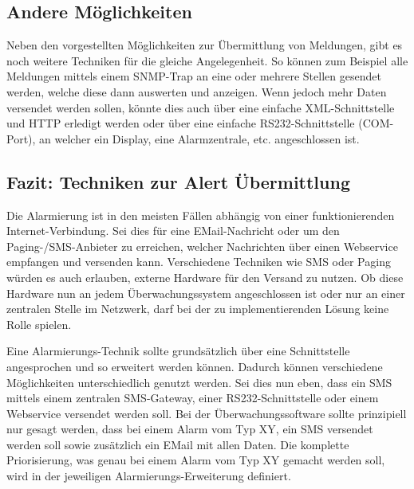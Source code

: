 \subsection{Andere M\"oglichkeiten} \label{sec:theorie-alert-other}
Neben den vorgestellten M\"oglichkeiten zur \"Ubermittlung von Meldungen, gibt es noch weitere Techniken f\"ur die gleiche Angelegenheit. So k\"onnen zum Beispiel alle Meldungen mittels einem SNMP-Trap an eine oder mehrere Stellen gesendet werden, welche diese dann auswerten und anzeigen. Wenn jedoch mehr Daten versendet werden sollen, k\"onnte dies auch \"uber eine einfache XML-Schnittstelle und HTTP erledigt werden oder \"uber eine einfache RS232-Schnittstelle (COM-Port), an welcher ein Display, eine Alarmzentrale, etc. angeschlossen ist.


\subsection{Fazit: Techniken zur Alert \"Ubermittlung} \label{sec:theorie-alert-fazit}
Die Alarmierung ist in den meisten F\"allen abh\"angig von einer funktionierenden Internet-Verbindung. Sei dies f\"ur eine EMail-Nachricht oder um den Paging-/SMS-Anbieter zu erreichen, welcher Nachrichten \"uber einen Webservice empfangen und versenden kann. Verschiedene Techniken wie SMS oder Paging w\"urden es auch erlauben, externe Hardware f\"ur den Versand zu nutzen. Ob diese Hardware nun an jedem \"Uberwachungssystem angeschlossen ist oder nur an einer zentralen Stelle im Netzwerk, darf bei der zu implementierenden L\"osung keine Rolle spielen.

Eine Alarmierungs-Technik sollte grunds\"atzlich \"uber eine Schnittstelle angesprochen und so erweitert werden k\"onnen. Dadurch k\"onnen verschiedene M\"oglichkeiten unterschiedlich genutzt werden. Sei dies nun eben, dass ein SMS mittels einem zentralen SMS-Gateway, einer RS232-Schnittstelle oder einem Webservice versendet werden soll. Bei der \"Uberwachungssoftware sollte prinzipiell nur gesagt werden, dass bei einem Alarm vom Typ XY, ein SMS versendet werden soll sowie zus\"atzlich ein EMail mit allen Daten. Die komplette Priorisierung, was genau bei einem Alarm vom Typ XY gemacht werden soll, wird in der jeweiligen Alarmierungs-Erweiterung definiert.


